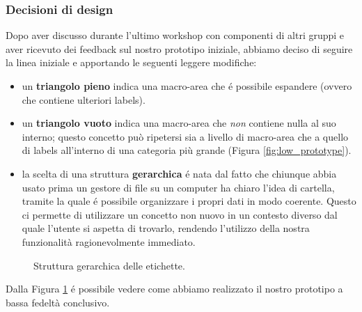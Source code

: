 \documentclass[12pt]{article} %
\begin{document}
\subsubsection{Decisioni di design}
Dopo aver discusso durante l'ultimo workshop con componenti di altri gruppi e aver ricevuto dei feedback sul nostro prototipo iniziale, abbiamo deciso di seguire la linea iniziale e apportando le seguenti leggere modifiche:
\begin{itemize}
\item un \textbf{triangolo pieno} indica una macro-area che \'e possibile espandere (ovvero che contiene ulteriori labels).
\item un \textbf{triangolo vuoto} indica una macro-area che \emph{non} contiene nulla al suo interno; questo concetto pu\`o ripetersi sia a livello di macro-area che a quello di labels all'interno di una categoria pi\`u grande (Figura \ref{fig:low_prototype}).
\item la scelta di una struttura \textbf{gerarchica} \'e nata dal fatto che chiunque abbia usato prima un gestore di file su un computer ha chiaro l'idea di cartella, tramite la quale \'e possibile organizzare i propri dati in modo coerente. Questo ci permette di utilizzare un concetto non nuovo in un contesto diverso dal 	quale l'utente si aspetta di trovarlo, rendendo l'utilizzo della nostra funzionalit\`a ragionevolmente immediato.
\end{itemize}

\begin{figure}[H] 
\caption{Struttura gerarchica delle etichette.}
\label{fig:low_prototype2}
\end{figure}

Dalla Figura \ref{fig:low_prototype2} \'e possibile vedere come abbiamo realizzato il nostro prototipo a bassa fedelt\`a conclusivo.
\end{document}
